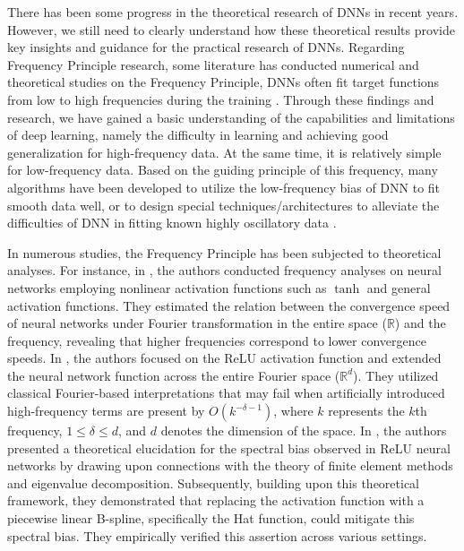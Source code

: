 \documentclass[review,onefignum,onetabnum,onealgnum]{siamart250106}
\numberwithin{theorem}{section}
\begin{document}
There has been some progress in the theoretical research of DNNs in recent years. However, we still need to clearly understand how these theoretical results provide key insights and guidance for the practical research of DNNs. Regarding Frequency Principle research, some literature has conducted numerical and theoretical studies on the Frequency Principle, DNNs often fit target functions from low to high frequencies during the training  \cite{HSTX:2022, XZLXM:2020, LMXZ:2021, XZX:2019, Rahaman:2019, ma2020machine, zhang2023shallow, choraria2022spectral, xu2024overview}. Through these findings and research, we have gained a basic understanding of the capabilities and limitations of deep learning, namely the difficulty in learning and achieving good generalization for high-frequency data. At the same time, it is relatively simple for low-frequency data. Based on the guiding principle of this frequency, many algorithms have been developed to utilize the low-frequency bias of DNN to fit smooth data well, or to design special techniques/architectures to alleviate the difficulties of DNN in fitting known highly oscillatory data \cite{liu2020multi, jagtap2020adaptive, tancik2020fourier, cai2019multi}.

In numerous studies, the Frequency Principle has been subjected to theoretical analyses. For instance, in \cite{XZLXM:2020, LMXZ:2021}, the authors conducted frequency analyses on neural networks employing nonlinear activation functions such as $\tanh$ and general activation functions. They estimated the relation between the convergence speed of neural networks under Fourier transformation in the entire space ($\mathbb{R}$) and the frequency, revealing that higher frequencies correspond to lower convergence speeds. In \cite{Rahaman:2019}, the authors focused on the ReLU activation function and extended the neural network function across the entire Fourier space ($\mathbb{R}^d$). They utilized classical Fourier-based interpretations that may fail when artificially introduced high-frequency terms are present by $O(k^{-\delta-1})$, where $k$ represents the $k$th frequency, $1\le \delta\le d$, and $d$ denotes the dimension of the space. In \cite{HSTX:2022}, the authors presented a theoretical elucidation for the spectral bias observed in ReLU neural networks by drawing upon connections with the theory of finite element methods and eigenvalue decomposition. Subsequently, building upon this theoretical framework, they demonstrated that replacing the activation function with a piecewise linear B-spline, specifically the Hat function, could mitigate this spectral bias. They empirically verified this assertion across various settings.
\end{document}
